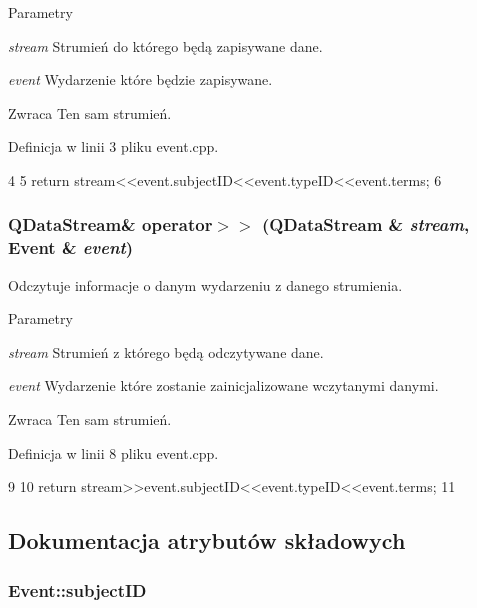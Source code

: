 \begin{DoxyParams}{Parametry}
\item[{\em stream}]Strumień do którego będą zapisywane dane. \item[{\em event}]Wydarzenie które będzie zapisywane. \end{DoxyParams}
\begin{DoxyReturn}{Zwraca}
Ten sam strumień. 
\end{DoxyReturn}


Definicja w linii 3 pliku event.cpp.




\begin{DoxyCode}
4 {
5     return stream<<event.subjectID<<event.typeID<<event.terms;
6 }
\end{DoxyCode}


\hypertarget{classEvent_a055427e98ad131966edb6fb652add004}{
\subsubsection[{operator$>$$>$}]{\setlength{\rightskip}{0pt plus 5cm}QDataStream\& operator$>$$>$ (QDataStream \& {\em stream}, \/  {\bf Event} \& {\em event})}}
\label{classEvent_a055427e98ad131966edb6fb652add004}


Odczytuje informacje o danym wydarzeniu z danego strumienia. 


\begin{DoxyParams}{Parametry}
\item[{\em stream}]Strumień z którego będą odczytywane dane. \item[{\em event}]Wydarzenie które zostanie zainicjalizowane wczytanymi danymi. \end{DoxyParams}
\begin{DoxyReturn}{Zwraca}
Ten sam strumień. 
\end{DoxyReturn}


Definicja w linii 8 pliku event.cpp.




\begin{DoxyCode}
9 {
10     return stream>>event.subjectID<<event.typeID<<event.terms;
11 }
\end{DoxyCode}




\subsection{Dokumentacja atrybutów składowych}
\hypertarget{classEvent_a584a3fce37eaa31ee45c202a538f59b6}{
\subsubsection[{subjectID}]{ {\bf Event::subjectID}}}
\label{classEvent_a584a3fce37eaa31ee45c202a538f59b6}


